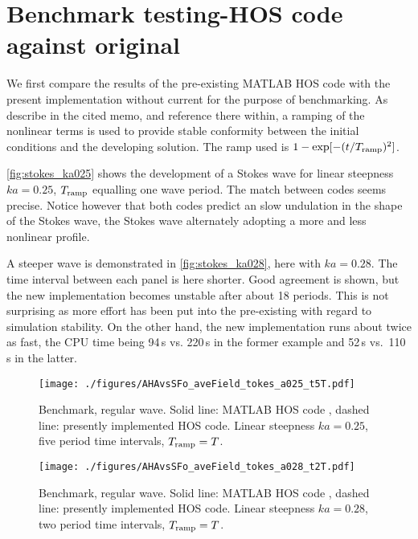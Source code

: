 \documentclass[a4paper,12pt]{article}
\renewcommand{\_}[1]{_\mr{#1}}
\begin{document}
\section{Benchmark testing-HOS code against original}
\label{sec:AHAvsSFO}
We first compare the results of the pre-existing MATLAB HOS code \citep{SFo2018_HOS} with the present implementation without current for the purpose of benchmarking. 
As describe in the cited memo, and reference there within, a ramping of the nonlinear terms is used to provide stable conformity between the initial conditions and the developing solution. 
The ramp used is 
$1-\exp[-(t/T\_{ramp})^2]$.

\autoref{fig:stokes_ka025} shows the development of a Stokes wave for linear steepness $ka = 0.25$, $T\_{ramp}$ equalling one wave period.
The match between codes seems precise. 
Notice however that both codes predict an slow undulation in the shape of the Stokes wave, the Stokes wave alternately adopting a more and less nonlinear profile.  

A steeper wave is demonstrated in \autoref{fig:stokes_ka028}, here with $ka = 0.28$. The time interval between each panel is here shorter. Good agreement is shown, but the new implementation becomes unstable after about 18 periods. This is not surprising as more effort has been put into the pre-existing with regard to simulation stability. On the other hand, the new implementation runs about twice as fast, the CPU time being 94\,s vs. 220\,s in the former example and 52\,s vs.\ 110\,s in the latter.

\begin{figure}[h!ptb]%
\centering
\texttt{[image: ./figures/AHAvsSFo\_waveField\_Stokes\_ka025\_dt5T.pdf]}%
\caption{Benchmark, regular wave. Solid line: MATLAB HOS code \citep{SFo2018_HOS}, dashed line: presently implemented HOS code.
Linear steepness $ka = 0.25$, five period time intervals, $T\_{ramp}=T$.
}%
\label{fig:stokes_ka025}%
\end{figure}
\begin{figure}[h!ptb]%
\centering
\texttt{[image: ./figures/AHAvsSFo\_waveField\_Stokes\_ka028\_dt2T.pdf]}%
\caption{Benchmark, regular wave. Solid line: MATLAB HOS code \citep{SFo2018_HOS}, dashed line: presently implemented HOS code.
Linear steepness $ka = 0.28$, two period time intervals, $T\_{ramp}=T$.
}%
\label{fig:stokes_ka028}%
\end{figure}
\end{document}
